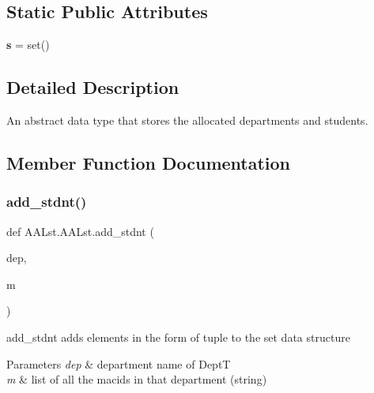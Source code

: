 \subsection*{Static Public Attributes}
\begin{DoxyCompactItemize}
\item 
\mbox{\label{class_a_a_lst_1_1_a_a_lst_a100f6b123aa0905173d59a87df350be7}} 
{\bfseries s} = set()
\end{DoxyCompactItemize}


\subsection{Detailed Description}
An abstract data type that stores the allocated departments and students. 

\subsection{Member Function Documentation}
\mbox{\label{class_a_a_lst_1_1_a_a_lst_a6cc4b320d445656b347115c3d440be45}} 
\subsubsection{\texorpdfstring{add\_stdnt()}{add\_stdnt()}}
{\footnotesize\ttfamily def A\+A\+Lst.\+A\+A\+Lst.\+add\+\_\+stdnt (\begin{DoxyParamCaption}\item[{}]{dep,  }\item[{}]{m }\end{DoxyParamCaption})\hspace{0.3cm}{\ttfamily [static]}}



add\+\_\+stdnt adds elements in the form of tuple to the set data structure 


\begin{DoxyParams}{Parameters}
{\em dep} & department name of DeptT \\
\hline
{\em m} & list of all the macids in that department (string) \\
\hline
\end{DoxyParams}
\mbox{\label{class_a_a_lst_1_1_a_a_lst_aecd1653cb6c7db79cff37d34294a9fc2}} 
